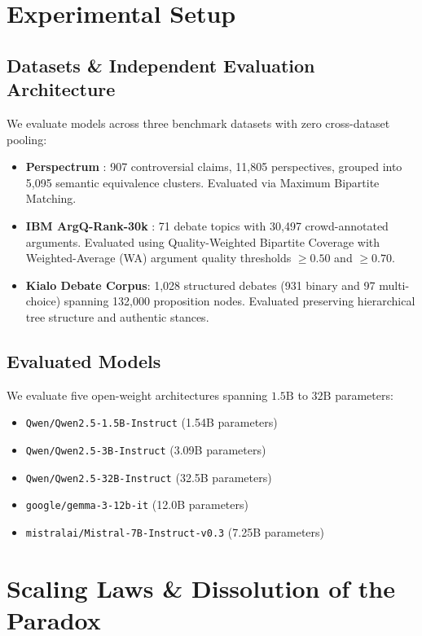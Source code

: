 \documentclass[11pt,a4paper]{article}
\begin{document}
\section{Experimental Setup}

\subsection{Datasets & Independent Evaluation Architecture}
We evaluate models across three benchmark datasets with zero cross-dataset pooling:
\begin{itemize}
    \item \textbf{Perspectrum} \cite{chen2019perspectrum}: 907 controversial claims, 11,805 perspectives, grouped into 5,095 semantic equivalence clusters. Evaluated via Maximum Bipartite Matching.
    \item \textbf{IBM ArgQ-Rank-30k} \cite{gretz2020large}: 71 debate topics with 30,497 crowd-annotated arguments. Evaluated using Quality-Weighted Bipartite Coverage with Weighted-Average (WA) argument quality thresholds $\ge 0.50$ and $\ge 0.70$.
    \item \textbf{Kialo Debate Corpus}: 1,028 structured debates (931 binary and 97 multi-choice) spanning 132,000 proposition nodes. Evaluated preserving hierarchical tree structure and authentic stances.
\end{itemize}

\subsection{Evaluated Models}
We evaluate five open-weight architectures spanning $1.5\text{B}$ to $32\text{B}$ parameters:
\begin{itemize}
    \item \texttt{Qwen/Qwen2.5-1.5B-Instruct} (1.54B parameters)
    \item \texttt{Qwen/Qwen2.5-3B-Instruct} (3.09B parameters)
    \item \texttt{Qwen/Qwen2.5-32B-Instruct} (32.5B parameters)
    \item \texttt{google/gemma-3-12b-it} (12.0B parameters)
    \item \texttt{mistralai/Mistral-7B-Instruct-v0.3} (7.25B parameters)
\end{itemize}

\section{Scaling Laws & Dissolution of the Paradox}
\end{document}
